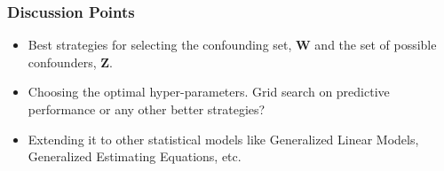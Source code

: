 \documentclass{beamer}
\begin{document}
\begin{frame}
	\frametitle{Discussion Points}
	\begin{itemize}
		\item Best strategies for selecting the confounding set, $
			\bm{W} $ and the set of possible confounders, $ \bm{Z}
			$.
		\item Choosing the optimal hyper-parameters. Grid search on
			predictive performance or any other better strategies?
		\item Extending it to other statistical models like Generalized
			Linear Models, Generalized Estimating Equations, etc.
	\end{itemize}
\end{frame}
\end{document}
